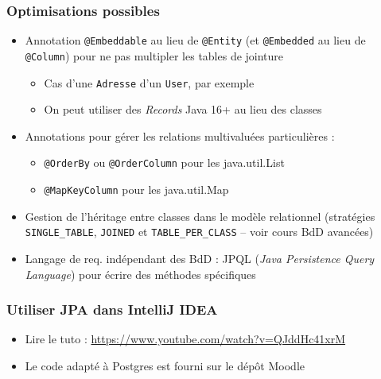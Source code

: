 \documentclass[aspectratio=169,10pt]{beamer}
\begin{document}
\begin{frame}
	\frametitle{Optimisations possibles}
	
	\begin{itemize}
		\item  Annotation \texttt{@Embeddable} au lieu de \texttt{@Entity} (et \texttt{@Embedded} au lieu de \texttt{@Column}) pour ne pas multipler les tables de jointure
		\begin{itemize}
			\item[-] Cas d'une \texttt{Adresse} d'un \texttt{User}, par exemple 
			\item[-] On peut utiliser des \textit{Records} Java 16+ au lieu des classes
		\end{itemize}
		\item Annotations pour gérer les relations multivaluées particulières :
		\begin{itemize}
			\item \texttt{@OrderBy} ou \texttt{@OrderColumn} pour les java.util.List
			\item \texttt{@MapKeyColumn} pour les java.util.Map
		\end{itemize}
				
		\item Gestion de l'héritage entre classes dans le modèle relationnel (stratégies \texttt{SINGLE\_TABLE}, \texttt{JOINED} et \texttt{TABLE\_PER\_CLASS} -- voir cours BdD avancées)
		\item Langage de req. indépendant des BdD : JPQL (\textit{Java Persistence Query Language}) pour écrire des méthodes spécifiques
	\end{itemize}
	
\end{frame}

\begin{frame}
	\frametitle{Utiliser JPA dans IntelliJ IDEA}
	
	\begin{itemize}
		\item Lire le tuto :
		\url{https://www.youtube.com/watch?v=QJddHc41xrM}
		\item Le code adapté à Postgres est fourni sur le dépôt Moodle
	\end{itemize}
\end{frame}

\rquestionslide
\end{document}

